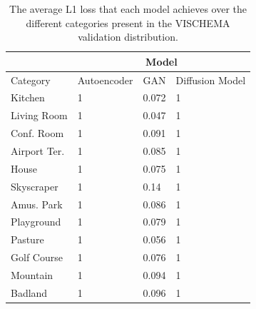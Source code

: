 \documentclass{UoYCSproject}
\begin{document}
\begin{table}[]
    \centering
    \begin{tabular}{|l|lll|}
        \hline
        \multicolumn{1}{|c|}{} & \multicolumn{3}{c|}{Model}                                                                         \\ \hline
        Category               & \multicolumn{1}{c|}{Autoencoder} & \multicolumn{1}{c|}{GAN}     & \multicolumn{1}{c|}{Diffusion Model} \\ \hline
        Kitchen                & \multicolumn{1}{l|}{1}           & \multicolumn{1}{l|}{0.072}   & 1                                    \\ \hline
        Living Room            & \multicolumn{1}{l|}{1}           & \multicolumn{1}{l|}{0.047}   & 1                                    \\ \hline
        Conf. Room             & \multicolumn{1}{l|}{1}           & \multicolumn{1}{l|}{0.091}   & 1                                    \\ \hline
        Airport Ter.           & \multicolumn{1}{l|}{1}           & \multicolumn{1}{l|}{0.085}   & 1                                    \\ \hline
        House                  & \multicolumn{1}{l|}{1}           & \multicolumn{1}{l|}{0.075}   & 1                                    \\ \hline
        Skyscraper             & \multicolumn{1}{l|}{1}           & \multicolumn{1}{l|}{0.14 }   & 1                                    \\ \hline
        Amus. Park             & \multicolumn{1}{l|}{1}           & \multicolumn{1}{l|}{0.086}   & 1                                    \\ \hline
        Playground             & \multicolumn{1}{l|}{1}           & \multicolumn{1}{l|}{0.079}   & 1                                    \\ \hline
        Pasture                & \multicolumn{1}{l|}{1}           & \multicolumn{1}{l|}{0.056}   & 1                                    \\ \hline
        Golf Course            & \multicolumn{1}{l|}{1}           & \multicolumn{1}{l|}{0.076}   & 1                                    \\ \hline
        Mountain               & \multicolumn{1}{l|}{1}           & \multicolumn{1}{l|}{0.094}   & 1                                    \\ \hline
        Badland                & \multicolumn{1}{l|}{1}           & \multicolumn{1}{l|}{0.096}   & 1                                    \\ \hline
    \end{tabular}
    \label{tab:categories}
    \caption{The average L1 loss that each model achieves over the different categories present in the VISCHEMA validation distribution.}
\end{table}
\end{document}
